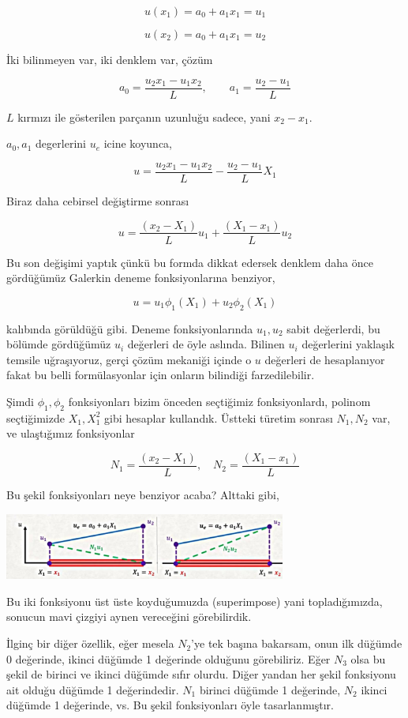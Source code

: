 \documentclass[12pt,fleqn]{article}\usepackage{../../common}
\begin{document}
$$
u(x_1) = a_0 + a_1 x_1 = u_1
$$

$$
u(x_2) = a_0 + a_1 x_1 = u_2
$$

İki bilinmeyen var, iki denklem var, çözüm

$$
a_0 = \frac{u_2 x_1 - u_1 x_2}{L}, \qquad a_1 = \frac{u_2 - u_1}{L}
$$

$L$ kırmızı ile gösterilen parçanın uzunluğu sadece, yani $x_2 - x_1$.

$a_0,a_1$ degerlerini $u_e$ icine koyunca,

$$
u = \frac{u_2 x_1 - u_1 x_2}{L} - \frac{u_2 - u_1}{L} X_1
$$

Biraz daha cebirsel değiştirme sonrası

$$
u = \frac{(x_2 - X_1)}{L} u_1 + \frac{(X_1 - x_1)}{L} u_2
$$

Bu son değişimi yaptık çünkü bu formda dikkat edersek denklem daha önce
gördüğümüz Galerkin deneme fonksiyonlarına benziyor,

$$
u = u_1 \phi_1(X_1) + u_2 \phi_2 (X_1)
$$

kalıbında görüldüğü gibi. Deneme fonksiyonlarında $u_1,u_2$ sabit değerlerdi, bu
bölümde gördüğümüz $u_i$ değerleri de öyle aslında. Bilinen $u_i$ değerlerini
yaklaşık temsile uğraşıyoruz, gerçi çözüm mekaniği içinde o $u$ değerleri de
hesaplanıyor fakat bu belli formülasyonlar için onların bilindiği
farzedilebilir.

Şimdi $\phi_1,\phi_2$ fonksiyonları bizim önceden seçtiğimiz fonksiyonlardı,
polinom seçtiğimizde $X_1,X_1^2$ gibi hesaplar kullandık. Üstteki türetim
sonrası $N_1,N_2$ var, ve ulaştığımız fonksiyonlar

$$
N_1 = \frac{(x_2 - X_1)}{L}, \quad N_2 = \frac{(X_1 - x_1)}{L} 
$$

Bu şekil fonksiyonları neye benziyor acaba? Alttaki gibi,

\includegraphics[width=25em]{compscieng_bpp45fem2_08.jpg}

Bu iki fonksiyonu üst üste koyduğumuzda (superimpose) yani topladığımızda,
sonucun mavi çizgiyi aynen vereceğini görebilirdik.

İlginç bir diğer özellik, eğer mesela $N_2$'ye tek başına bakarsam, onun ilk
düğümde 0 değerinde, ikinci düğümde 1 değerinde olduğunu görebiliriz.  Eğer
$N_3$ olsa bu şekil de birinci ve ikinci düğümde sıfır olurdu. Diğer yandan her
şekil fonksiyonu ait olduğu düğümde 1 değerindedir. $N_1$ birinci düğümde 1
değerinde, $N_2$ ikinci düğümde 1 değerinde, vs. Bu şekil fonksiyonları öyle
tasarlanmıştır.
\end{document}
